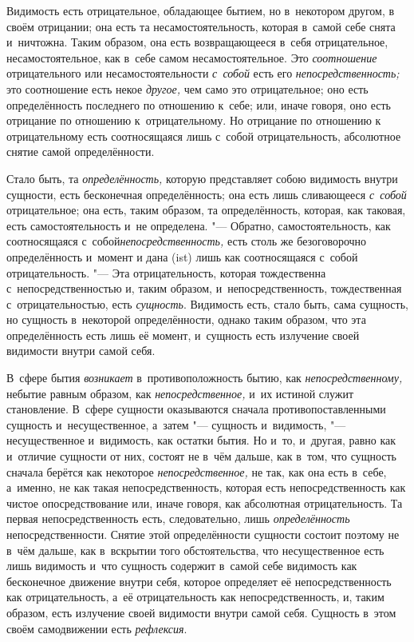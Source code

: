 Видимость есть отрицательное, обладающее бытием, но в~некотором другом, в
своём отрицании; она есть та несамостоятельность, которая в~самой себе
снята и~ничтожна. Таким образом, она есть возвращающееся в~себя
отрицательное, несамостоятельное, как в~себе самом несамостоятельное. Это
{\em соотношение} отрицательного или
несамостоятельности {\em с~собой} есть его
{\em непосредственность;} это соотношение есть некое
{\em другое,} чем само это отрицательное; оно есть
определённость последнего по отношению к~себе; или, иначе говоря, оно есть
отрицание по отношению к~отрицательному. Но отрицание по отношению к
отрицательному есть соотносящаяся лишь с~собой отрицательность, абсолютное
снятие самой определённости.

Стало быть, та {\em определённость,} которую
представляет собою видимость внутри сущности, есть бесконечная
определённость; она есть лишь сливающееся {\em с~собой}
отрицательное; она есть, таким образом, та определённость, которая, как
таковая, есть самостоятельность и~не определена. "--- Обратно,
самостоятельность, как соотносящаяся с~собой{\em непосредственность,}
есть столь же безоговорочно определённость и~момент и
дана (ist) лишь как соотносящаяся с~собой отрицательность. "--- Эта
отрицательность, которая тождественна с~непосредственностью и, таким
образом, и~непосредственность, тождественная с~отрицательностью, есть
{\em сущность}. Видимость есть, стало быть, сама
сущность, но сущность в~некоторой определённости, однако таким образом, что
эта определённость есть лишь её момент, и~сущность есть излучение своей
видимости внутри самой себя.

В~сфере бытия {\em возникает} в~противоположность бытию,
как {\em непосредственному,} небытие равным образом,
как {\em непосредственное,} и~их истиной служит становление. В~сфере
сущности оказываются сначала противопоставленными сущность и~несущественное,
а~затем "--- сущность и~видимость, "--- несущественное
и~видимость, как остатки бытия. Но и~то, и~другая, равно как и~отличие
сущности от них, состоят не в~чём дальше, как в~том, что сущность сначала
берётся как некоторое {\em непосредственное,} не так,
как она есть в~себе, а~именно, не как такая непосредственность, которая
есть непосредственность как чистое опосредствование или, иначе говоря, как
абсолютная отрицательность. Та первая непосредственность есть,
следовательно, лишь {\em определённость}
непосредственности. Снятие этой определённости сущности состоит поэтому не
в~чём дальше, как в~вскрытии того обстоятельства, что несущественное есть
лишь видимость и~что сущность содержит в~самой себе видимость как
бесконечное движение внутри себя, которое определяет её непосредственность
как отрицательность, а~её отрицательность как непосредственность, и, таким
образом, есть излучение своей видимости внутри самой себя. Сущность в~этом
своём самодвижении есть {\em рефлексия}.

